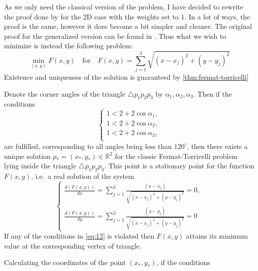 As we only need the classical version of the problem, I have decided to rewrite
the proof done by \textcite{uteshev2014} for the 2D case with the weights set to
$1$. In a lot of ways, the proof is the same, however it does become a bit
simpler and cleaner. The original proof for the generalized version can be found
in \textcite{uteshev2014}. Thus what we wish to minimize is instead the
following problem:
%
\begin{equation}
  \min_{(x,y)} F(x,y) \quad \text{for} \quad F(x,y) = \sum_{j=1}^3
  \sqrt{{(x-x_j)}^2 + {(y-y_j)}^2}
\end{equation}
%
Existence and uniqueness of the solution is guaranteed by
\cref{thm:fermat-torricelli}
%
\begin{theorem}
\label{thm:fermat-torricelli}
  Denote the corner angles of the triangle $\triangle p_1 p_2 p_3$ by $\alpha_1, \alpha_2,
  \alpha_3$. Then if the conditions
  \begin{equation}
    \label{eq:12}
    \left\{
      \begin{array}{c}
        1 < 2 + 2 \cos \alpha_1 , \\
        1 < 2 + 2 \cos \alpha_2 , \\
        1 < 2 + 2 \cos \alpha_3 , \\
      \end{array}
    \right.
  \end{equation}
  are fulfilled, corresponding to all angles being less than $120^{\circ}$, then
  there exists a unique solution $p_\ast = (x_\ast, y_\ast) \in \mathbb{R}^2$
  for the classic Fermat-Torricelli problem lying inside the triangle
  $\triangle p_1 p_2 p_3$. This point is a stationary point for the function
  $F(x,y)$, i.e.\ a real solution of the system
  \begin{equation}
    \label{eq:13}
    \left\{
      \begin{array}{c}
        \frac{d(F(x,y))}{dx} = \sum_{j=1}^3 \frac{(x-x_j)}{\sqrt{{(x-x_j)}^2 +
        {(y - y_j)}^2}} = 0, \\
        \frac{d(F(x,y))}{dy} = \sum_{j=1}^3 \frac{(y-y_j)}{\sqrt{{(x-x_j)}^2 +
        {(y - y_j)}^2}} = 0
      \end{array}
    \right.
  \end{equation}
  If any of the conditions in \cref{eq:12} is violated then $F(x,y)$ attains its
  minimum value at the corresponding vertex of triangle.
\end{theorem}
%
Calculating the coordinates of the point $(x_\ast, y_\ast)$, if the conditions
